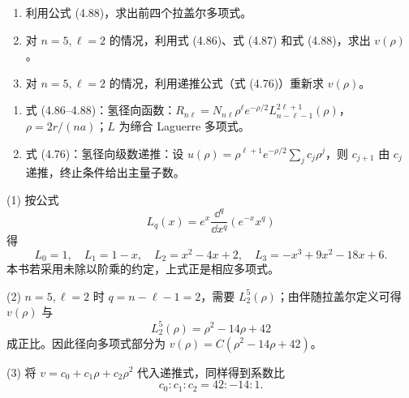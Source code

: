 \begin{question}
\begin{enumerate}
\item 利用公式 (4.88)，求出前四个拉盖尔多项式。
\item 对 $n=5,\ell=2$ 的情况，利用式 (4.86)、式 (4.87) 和式 (4.88)，求出 $v(\rho)$。
\item 对 $n=5,\ell=2$ 的情况，利用递推公式（式 (4.76)）重新求 $v(\rho)$。
\end{enumerate}

\par\smallskip
{}
\begin{enumerate}[leftmargin=2.2em,itemsep=0.12em,topsep=0.12em,parsep=0pt]
\item 式 (4.86--4.88)：氢径向函数：$R_{n\ell}=N_{n\ell}\rho^\ell e^{-\rho/2}L_{n-\ell-1}^{2\ell+1}(\rho)$，$\rho=2r/(na)$；$L$ 为缔合 Laguerre 多项式。
\item 式 (4.76)：氢径向级数递推：设 $u(\rho)=\rho^{\ell+1}e^{-\rho/2}\sum_j c_j\rho^j$，则 $c_{j+1}$ 由 $c_j$ 递推，终止条件给出主量子数。
\end{enumerate}

\end{question}
\begin{solution}

(1) 按公式
\[
L_q(x)=e^x\frac{\dd^q}{\dd x^q}(e^{-x}x^q)
\]
得
\[
L_0=1,
\quad L_1=1-x,
\quad L_2=x^2-4x+2,
\quad L_3=-x^3+9x^2-18x+6.
\]
本书若采用未除以阶乘的约定，上式正是相应多项式。

(2) $n=5,\ell=2$ 时 $q=n-\ell-1=2$，需要 $L_2^{5}(\rho)$；由伴随拉盖尔定义可得 $v(\rho)$ 与
\[
L_2^5(\rho)=\rho^2-14\rho+42
\]
成正比。因此径向多项式部分为 $v(\rho)=C(\rho^2-14\rho+42)$。

(3) 将 $v=c_0+c_1\rho+c_2\rho^2$ 代入递推式，同样得到系数比
\[
c_0:c_1:c_2=42:-14:1.
\]

\end{solution}

